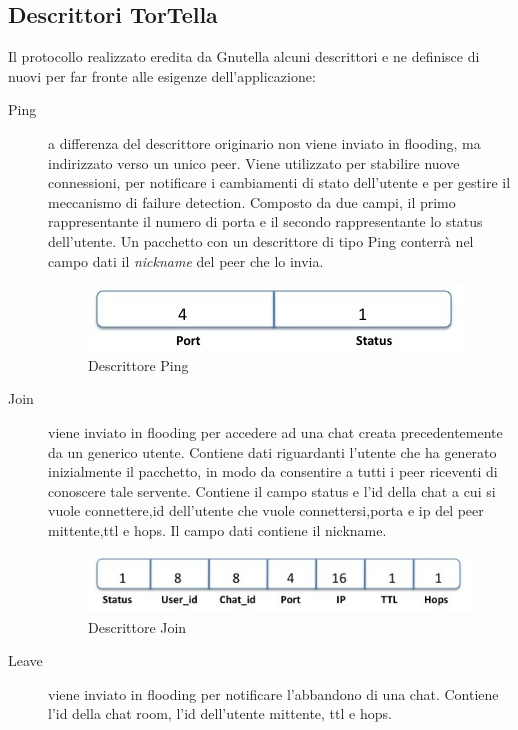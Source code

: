 \subsection{Descrittori TorTella}
Il protocollo realizzato eredita da Gnutella alcuni descrittori e ne definisce di nuovi per far fronte alle esigenze dell’applicazione:
\begin{description}
\item[Ping] a differenza del descrittore originario non viene inviato in flooding, ma indirizzato verso un unico peer. Viene utilizzato per stabilire nuove connessioni, per notificare i cambiamenti di stato dell'utente e per gestire il meccanismo di failure detection. Composto da due campi, il primo rappresentante il numero di porta e il secondo rappresentante lo status dell’utente. Un pacchetto con un descrittore di tipo Ping conterrà nel campo dati il \textit{nickname} del peer che lo invia.
\begin{figure}[H]
\begin{center}
\includegraphics[scale=0.7]{etc/ping.jpg}
\caption{Descrittore Ping}
\label{ping}
\end{center}
\end{figure}
\item[Join] viene inviato in flooding per accedere ad una chat creata precedentemente da un generico utente. Contiene dati riguardanti l'utente che ha generato inizialmente il pacchetto, in modo da consentire a tutti i peer riceventi di conoscere tale servente. Contiene il campo status e l’id della chat a cui si vuole connettere,id dell'utente che vuole connettersi,porta e ip del peer mittente,ttl e hops. Il campo dati contiene il nickname.
\begin{figure}[H]
\begin{center}
\includegraphics[scale=0.7]{etc/join.jpg}
\caption{Descrittore Join}
\label{join}
\end{center}
\end{figure}
\item[Leave] viene inviato in flooding per notificare l'abbandono di una chat. Contiene l’id della chat room, l'id dell'utente mittente, ttl e hops.

\end{description}
